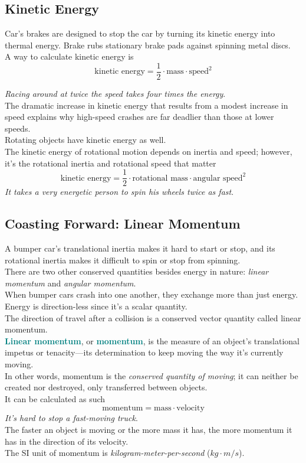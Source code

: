 \documentclass[12pt]{article}
\theoremstyle{definition}
\newcommand{\defnterm}[1]{\textbf{\textcolor{teal}{#1}}\index{#1}}
\begin{document}
\subsection{Kinetic Energy}
Car's brakes are designed to stop the car by turning its kinetic energy into thermal energy.
Brake rubs stationary brake pads against spinning metal discs. \\

A way to calculate kinetic energy is
$$\text{kinetic energy} = \frac{1}{2} \cdot \text{mass} \cdot \text{speed}^{2}$$

\emph{Racing around at twice the speed takes four times the energy}. \\
The dramatic increase in kinetic energy that results from a modest increase in speed explains why high-speed crashes are far deadlier than those at lower speeds. \\

Rotating objects have kinetic energy as well. \\
The kinetic energy of rotational motion depends on inertia and speed;
however, it's the rotational inertia and rotational speed that matter
$$\text{kinetic energy} = \frac{1}{2} \cdot \text{rotational mass} \cdot \text{angular speed}^{2}$$
\emph{It takes a very energetic person to spin his wheels twice as fast}.

\subsection{Coasting Forward: Linear Momentum}
A bumper car's translational inertia makes it hard to start or stop, and its rotational inertia makes it difficult to spin or stop from spinning. \\
There are two other conserved quantities besides energy in nature: \emph{linear momentum} and \emph{angular momentum}. \\

When bumper cars crash into one another, they exchange more than just energy. \\
Energy is direction-less since it's a scalar quantity. \\
The direction of travel after a collision is a conserved vector quantity called linear momentum. \\
\defnterm{Linear momentum}, or \defnterm{momentum}, is the measure of an object's translational impetus or tenacity---its determination to keep moving the way it's currently moving. \\
In other words, momentum is the \emph{conserved quantity of moving};
it can neither be created nor destroyed, only transferred between objects. \\
It can be calculated as such
$$\text{momentum} = \text{mass} \cdot \text{velocity}$$
\emph{It's hard to stop a fast-moving truck}. \\
The faster an object is moving or the more mass it has, the more momentum it has in the direction of its velocity. \\
The SI unit of momentum is \emph{kilogram-meter-per-second} ($kg \cdot m / s$).
\end{document}
